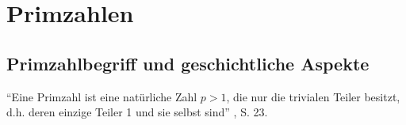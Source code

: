 %
%

\chapter{Primzahlen}

\section{Primzahlbegriff und geschichtliche Aspekte}
\begin{definition}[Primzahl]
``Eine Primzahl ist eine natürliche Zahl $p > 1$, die nur 
die trivialen Teiler besitzt, d.h. deren einzige Teiler
1 und sie selbst sind'' \cite{schichlsteinbauer}, S. 23.
\end{definition}
\vspace{-.5cm}

